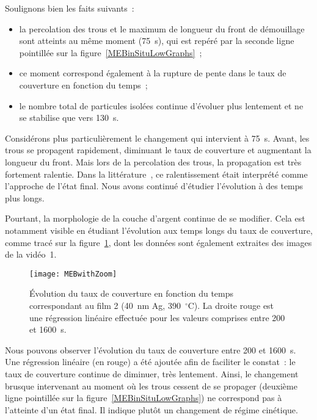 Soulignons bien les faits suivants~:
\begin{itemize}
\item la percolation des trous et le maximum de longueur du front de démouillage sont atteints au même moment (75~s), qui est repéré par la seconde ligne pointillée sur la figure~\ref{MEBinSituLowGraphs}~;
\item ce moment correspond également à la rupture de pente dans le taux de couverture en fonction du temps~;
\item le nombre total de particules isolées continue d'évoluer plus lentement et ne se stabilise que vers 130~s.
\end{itemize}
Considérons plus particulièrement le changement qui intervient à 75~s. Avant, les trous se propagent rapidement, diminuant le taux de couverture et augmentant la longueur du front. Mais lors de la percolation des trous, la propagation est très fortement ralentie. Dans la littérature~\cite{presland1972hillock}, ce ralentissement était interprété comme l'approche de l'état final. Nous avons continué d'étudier l'évolution à des temps plus longs.\par 
Pourtant, la morphologie de la couche d'argent continue de se modifier. Cela est notamment visible en étudiant l'évolution aux temps longs du taux de couverture, comme tracé sur la figure~\ref{MEBzoom}, dont les données sont également extraites des images de la vidéo~1.

\begin{figure}[h]
	\centering
	\texttt{[image: MEBwithZoom]}
	\caption{\'Evolution du taux de couverture en fonction du temps correspondant au film 2 (40~nm Ag, 390~$^\circ$C). La droite rouge est une régression linéaire effectuée pour les valeurs comprises entre 200 et 1600~s.}
	\label{MEBzoom}
\end{figure}

Nous pouvons observer l'évolution du taux de couverture entre 200 et 1600~s. Une régression linéaire (en rouge) a été ajoutée afin de faciliter le constat~: le taux de couverture continue de diminuer, très lentement. Ainsi, le changement brusque intervenant au moment où les trous cessent de se propager (deuxième ligne pointillée sur la figure~\ref{MEBinSituLowGraphs}) ne correspond pas à l'atteinte d'un état final. Il indique plutôt un changement de régime cinétique.




